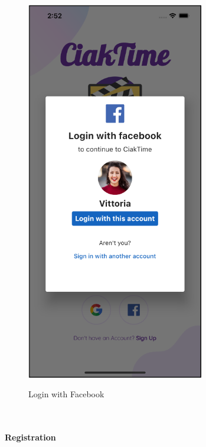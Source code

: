 \documentclass[12pt, a4paper]{article}
\numberwithin{figure}{section}
\begin{document}
\begin{center}
\begin{minipage}[t]{0.32\textwidth}
\begin{figure}[H]
			\centering
			\includegraphics[width=0.69\textwidth]{images/prototype2/loginFacebook.png}\\
			\caption{Login with Facebook}
		\end{figure}
	\end{minipage}	
\end{center}

\mbox{}\\

\paragraph{Registration}
\end{document}
